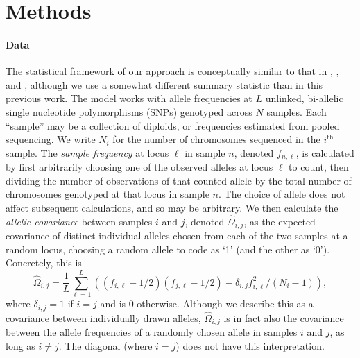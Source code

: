 \documentclass[12pt]{article}
\begin{document}
\section*{Methods}

\paragraph{Data}
The statistical framework of our approach is conceptually similar to that in \cite{Wasser2004}, \cite{BEDASSLE}, and \cite{spacemix},
although we use a somewhat different summary statistic than in this previous work.
The model works with allele frequencies at $L$ unlinked, bi-allelic single nucleotide polymorphisms (SNPs) genotyped across $N$ samples.
Each ``sample'' may be a collection of diploids, or frequencies estimated from pooled sequencing.
We write $N_i$ for the number of chromosomes sequenced in the $i^\text{th}$ sample.
The \emph{sample frequency} at locus $\ell$ in sample $n$, denoted $f_{n,\ell}$, 
is calculated by first arbitrarily choosing one of the observed alleles at locus $\ell$ to count, 
then dividing the number of observations of that counted allele by the total number of chromosomes genotyped at that locus
in sample $n$.
The choice of allele does not affect subsequent calculations, and so may be arbitrary.
We then calculate the \emph{allelic covariance} between samples $i$ and $j$, denoted $\widehat{\Omega}_{i,j}$,
as the expected covariance of distinct individual alleles chosen from each of the two samples at a random locus,
choosing a random allele to code as `1' (and the other as `0').
Concretely, this is
\begin{equation}
\widehat{\Omega}_{i,j} = 
    \frac{1}{L} \sum_{\ell=1}^L \left( (f_{i,\ell}-1/2) (f_{j,\ell}-1/2) - \delta_{i,j} f_{i,\ell}^2 / (N_i-1) \right),
\label{allelic_covariance}
\end{equation}
where $\delta_{i,j}=1$ if $i=j$ and is 0 otherwise.
Although we describe this as a covariance between individually drawn alleles,
$\widehat{\Omega}_{i,j}$ is in fact also the covariance between the allele frequencies
of a randomly chosen allele in samples $i$ and $j$, as long as $i \neq j$.
The diagonal (where $i=j$) does not have this interpretation.
\end{document}

